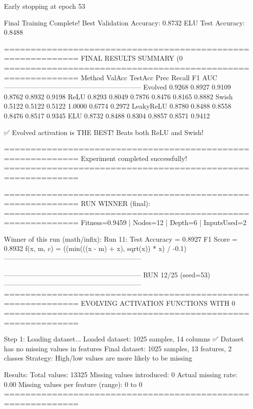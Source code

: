 Early stopping at epoch 53

Final Training Complete!
Best Validation Accuracy: 0.8732
ELU Test Accuracy: 0.8488

============================================================
FINAL RESULTS SUMMARY (0%
============================================================
Method             ValAcc     TestAcc    Prec       Recall     F1         AUC
------------------------------------------------------------
Evolved            0.9268     0.8927     0.9109     0.8762     0.8932     0.9198
ReLU               0.8293     0.8049     0.7876     0.8476     0.8165     0.8882
Swish              0.5122     0.5122     0.5122     1.0000     0.6774     0.2972
LeakyReLU          0.8780     0.8488     0.8558     0.8476     0.8517     0.9345
ELU                0.8732     0.8488     0.8304     0.8857     0.8571     0.9412

✅ Evolved activation is THE BEST! Beats both ReLU and Swish!

============================================================
Experiment completed successfully!
============================================================

============================================================
RUN WINNER (final):
============================================================
Fitness=0.9459 | Nodes=12 | Depth=6 | InputsUsed=2

Winner of this run (math/infix):
  Run 11:
     Test Accuracy = 0.8927
     F1 Score      = 0.8932
     f(x, m, c)    = ((min(((x - m) + x), sqrt(x)) * x) / -0.1)
------------------------------------------------------------

------------------------------------------------------------
RUN 12/25 (seed=53)
------------------------------------------------------------
============================================================
EVOLVING ACTIVATION FUNCTIONS
WITH 0%
============================================================

Step 1: Loading dataset...
Loaded dataset: 1025 samples, 14 columns
✅ Dataset has no missing values in features
Final dataset: 1025 samples, 13 features, 2 classes
Strategy: High/low values are more likely to be missing

Results:
  Total values: 13325
  Missing values introduced: 0
  Actual missing rate: 0.00%
  Missing values per feature (range): 0 to 0
============================================================


